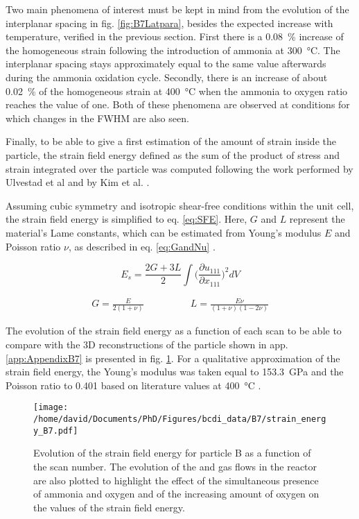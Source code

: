 Two main phenomena of interest must be kept in mind from the evolution of the interplanar spacing in fig. \ref{fig:B7Latpara}, besides the expected increase with temperature, verified in the previous section.
First there is a \qty{0.08}{\percent} increase of the homogeneous strain following the introduction of ammonia at \qty{300}{\degreeCelsius}.
The interplanar spacing stays approximately equal to the same value afterwards during the ammonia oxidation cycle.
Secondly, there is an increase of about \qty{0.02}{\percent} of the homogeneous strain at \qty{400}{\degreeCelsius} when the ammonia to oxygen ratio reaches the value of one.
Both of these phenomena are observed at conditions for which changes in the FWHM are also seen.

Finally, to be able to give a first estimation of the amount of strain inside the particle, the strain field energy defined as the sum of the product of stress and strain integrated over the particle \parencite{Cahn1959} was computed following the work performed by Ulvestad et al \parencite*{Ulvestad2015a} and by Kim et al. \parencite*{Kim2019}.

Assuming cubic symmetry and isotropic shear-free conditions within the unit cell, the strain field energy is simplified to eq. \ref{eq:SFE}.
Here, $G$ and $L$ represent the material's Lame constants, which can be estimated from Young's modulus $E$ and Poisson ratio $\nu$, as described in eq. \ref{eq:GandNu} \parencite{Mavko2020}.

\begin{equation}
    E_s = \frac{2G + 3L}{2} \int \Big( \frac{\partial u_{111}}{\partial x_{111}}\Big)^2 dV
    \label{eq:SFE}
\end{equation}

\begin{align}
    G = \frac{E}{2(1+\nu)} \qquad & \qquad L = \frac{E \nu}{(1+\nu)(1-2\nu)}
    \label{eq:GandNu}
\end{align}

The evolution of the strain field energy as a function of each scan to be able to compare with the 3D reconstructions of the particle shown in app. \ref{app:AppendixB7} is presented in fig. \ref{fig:B7SFE}.
For a qualitative approximation of the strain field energy, the Young's modulus was taken equal to \qty{153.3}{\giga\pascal} and the Poisson ratio to \num{0.401} based on literature values at \qty{400}{\degreeCelsius} \parencite{Matthey2022}.

\begin{figure}[!htb]
    \centering
    \texttt{[image: /home/david/Documents/PhD/Figures/bcdi\_data/B7/strain\_energy\_B7.pdf]}
    \caption{
        Evolution of the strain field energy for particle B as a function of the scan number.
        The evolution of the  and  gas flows in the reactor are also plotted to highlight the effect of the simultaneous presence of ammonia and oxygen and of the increasing amount of oxygen on the values of the strain field energy.
    }
    \label{fig:B7SFE}
\end{figure}

